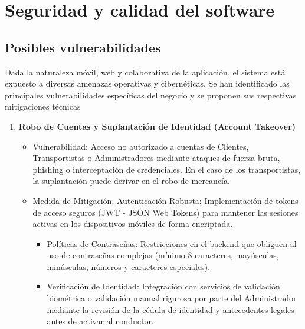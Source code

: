 \chapter{Seguridad y calidad del software}
\label{Seguridad y calidad del software}

\section{Posibles vulnerabilidades}

Dada la naturaleza móvil, web y colaborativa de la aplicación, el sistema está expuesto a diversas amenazas operativas y cibernéticas. Se han identificado las principales vulnerabilidades específicas del negocio y se proponen sus respectivas mitigaciones técnicas

\begin{enumerate}
	\item \textbf{Robo de Cuentas y Suplantación de Identidad (Account Takeover)}
	\begin{itemize}
		\item Vulnerabilidad: Acceso no autorizado a cuentas de Clientes, Transportistas o Administradores mediante ataques de fuerza bruta, phishing o interceptación de credenciales. En el caso de los transportistas, la suplantación puede derivar en el robo de mercancía.
		\item Medida de Mitigación: Autenticación Robusta: Implementación de tokens de acceso seguros (JWT - JSON Web Tokens) para mantener las sesiones activas en los dispositivos móviles de forma encriptada.
		\begin{itemize}
			\item Políticas de Contraseñas: Restricciones en el backend que obliguen al uso de contraseñas complejas (mínimo 8 caracteres, mayúsculas, minúsculas, números y caracteres especiales).
			\item Verificación de Identidad: Integración con servicios de validación biométrica o validación manual rigurosa por parte del Administrador mediante la revisión de la cédula de identidad y antecedentes legales antes de activar al conductor.
		\end{itemize}
	\end{itemize}
	

\end{enumerate}
